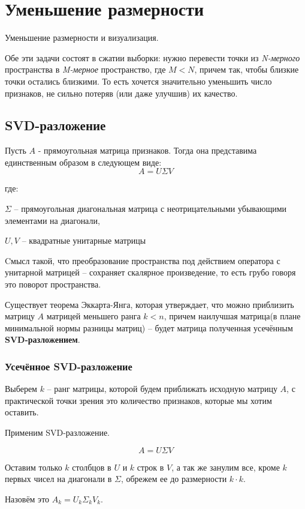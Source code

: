 \section{Уменьшение размерности}
Уменьшение размерности и визуализация. 

Обе эти задачи состоят в сжатии выборки: нужно перевести точки из \textit{N-мерного} пространства в \textit{M-мерное} пространство, где $M < N$, причем так, чтобы близкие точки остались близкими. То есть хочется значительно уменьшить число признаков, не сильно потеряв (или даже улучшив) их качество.
\subsection{SVD-разложение}
Пусть $A$ - прямоугольная матрица признаков. Тогда она представима единственным образом в следующем виде:
\begin{equation}
    A = U \Sigma V
\end{equation}

где:

$\Sigma$ -- прямоугольная диагональная матрица с неотрицательными убывающими элементами на диагонали,

$U, V$ -- квадратные унитарные матрицы

Cмысл такой, что преобразование пространства под действием оператора с унитарной матрицей -- сохраняет скалярное произведение, то есть грубо говоря это поворот пространства. 

Существует теорема Эккарта-Янга, которая утверждает, что можно приблизить матрицу $A$ матрицей меньшего ранга $k < n$, причем наилучшая матрица(в плане минимальной нормы разницы матриц) -- будет матрица полученная усечённым \textbf{SVD-разложением}.

\subsubsection*{Усечённое SVD-разложение}
Выберем $k$ -- ранг матрицы, которой будем приближать исходную матрицу $A$, с практической точки зрения это количество признаков, которые мы хотим оставить.

Применим SVD-разложение. 

$$A = U \Sigma V$$

Оставим только $k$ столбцов в $U$ и $k$ строк в $V$, а так же занулим все, кроме $k$ первых чисел на диагонали в $\Sigma$, обрежем ее до размерности $k \cdot k$.

Назовём это $A_{k} = U_{k} \Sigma_{k} V_{k}$. 

